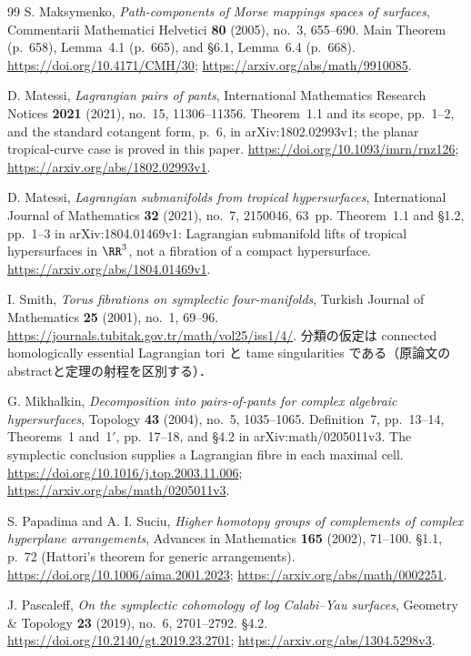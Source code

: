 \begin{thebibliography}{99}
S. Maksymenko,
\emph{Path-components of Morse mappings spaces of surfaces},
Commentarii Mathematici Helvetici \textbf{80} (2005), no.~3, 655--690.
Main Theorem (p.~658), Lemma~4.1 (p.~665), and \S6.1, Lemma~6.4 (p.~668).
\url{https://doi.org/10.4171/CMH/30};
\url{https://arxiv.org/abs/math/9910085}.

D. Matessi,
\emph{Lagrangian pairs of pants},
International Mathematics Research Notices \textbf{2021} (2021), no.~15, 11306--11356.
Theorem~1.1 and its scope, pp.~1--2, and the standard cotangent form, p.~6,
in arXiv:1802.02993v1; the planar tropical-curve case is proved in this paper.
\url{https://doi.org/10.1093/imrn/rnz126};
\url{https://arxiv.org/abs/1802.02993v1}.

D. Matessi,
\emph{Lagrangian submanifolds from tropical hypersurfaces},
International Journal of Mathematics \textbf{32} (2021), no.~7, 2150046, 63~pp.
Theorem~1.1 and \S1.2, pp.~1--3 in arXiv:1804.01469v1:
Lagrangian submanifold lifts of tropical hypersurfaces in $\RR^3$,
not a fibration of a compact hypersurface.
\url{https://arxiv.org/abs/1804.01469v1}.

I. Smith,
\emph{Torus fibrations on symplectic four-manifolds},
Turkish Journal of Mathematics \textbf{25} (2001), no.~1, 69--96.
\url{https://journals.tubitak.gov.tr/math/vol25/iss1/4/}.
分類の仮定は connected homologically essential Lagrangian tori と
tame singularities である（原論文のabstractと定理の射程を区別する）．

G. Mikhalkin,
\emph{Decomposition into pairs-of-pants for complex algebraic hypersurfaces},
Topology \textbf{43} (2004), no.~5, 1035--1065.
Definition~7, pp.~13--14, Theorems~1 and~1$'$, pp.~17--18,
and \S4.2 in arXiv:math/0205011v3.
The symplectic conclusion supplies a Lagrangian fibre in each maximal cell.
\url{https://doi.org/10.1016/j.top.2003.11.006};
\url{https://arxiv.org/abs/math/0205011v3}.

S. Papadima and A. I. Suciu,
\emph{Higher homotopy groups of complements of complex hyperplane arrangements},
Advances in Mathematics \textbf{165} (2002), 71--100.
\S1.1, p.~72 (Hattori's theorem for generic arrangements).
\url{https://doi.org/10.1006/aima.2001.2023};
\url{https://arxiv.org/abs/math/0002251}.

J. Pascaleff,
\emph{On the symplectic cohomology of log Calabi--Yau surfaces},
Geometry \& Topology \textbf{23} (2019), no.~6, 2701--2792.
\S4.2.
\url{https://doi.org/10.2140/gt.2019.23.2701};
\url{https://arxiv.org/abs/1304.5298v3}.


\end{thebibliography}
